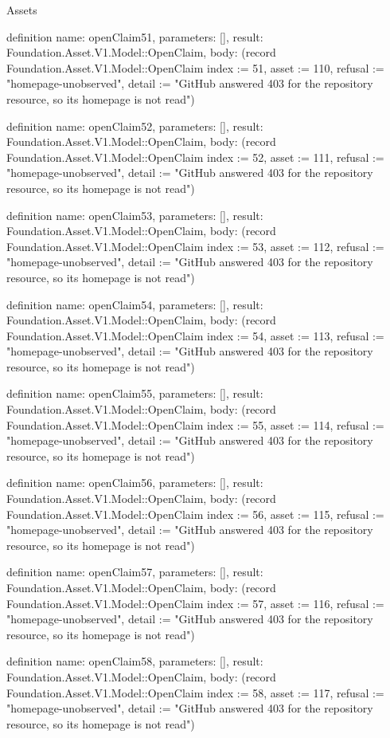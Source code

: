 \begin{lexlean}{Assets}
\begin{semanticmodule}
definition{
  name: openClaim51,
  parameters: [],
  result: Foundation.Asset.V1.Model::OpenClaim,
  body: (record Foundation.Asset.V1.Model::OpenClaim {index := 51, asset := 110, refusal := "homepage-unobserved", detail := "GitHub answered 403 for the repository resource, so its homepage is not read"})
}

definition{
  name: openClaim52,
  parameters: [],
  result: Foundation.Asset.V1.Model::OpenClaim,
  body: (record Foundation.Asset.V1.Model::OpenClaim {index := 52, asset := 111, refusal := "homepage-unobserved", detail := "GitHub answered 403 for the repository resource, so its homepage is not read"})
}

definition{
  name: openClaim53,
  parameters: [],
  result: Foundation.Asset.V1.Model::OpenClaim,
  body: (record Foundation.Asset.V1.Model::OpenClaim {index := 53, asset := 112, refusal := "homepage-unobserved", detail := "GitHub answered 403 for the repository resource, so its homepage is not read"})
}

definition{
  name: openClaim54,
  parameters: [],
  result: Foundation.Asset.V1.Model::OpenClaim,
  body: (record Foundation.Asset.V1.Model::OpenClaim {index := 54, asset := 113, refusal := "homepage-unobserved", detail := "GitHub answered 403 for the repository resource, so its homepage is not read"})
}

definition{
  name: openClaim55,
  parameters: [],
  result: Foundation.Asset.V1.Model::OpenClaim,
  body: (record Foundation.Asset.V1.Model::OpenClaim {index := 55, asset := 114, refusal := "homepage-unobserved", detail := "GitHub answered 403 for the repository resource, so its homepage is not read"})
}

definition{
  name: openClaim56,
  parameters: [],
  result: Foundation.Asset.V1.Model::OpenClaim,
  body: (record Foundation.Asset.V1.Model::OpenClaim {index := 56, asset := 115, refusal := "homepage-unobserved", detail := "GitHub answered 403 for the repository resource, so its homepage is not read"})
}

definition{
  name: openClaim57,
  parameters: [],
  result: Foundation.Asset.V1.Model::OpenClaim,
  body: (record Foundation.Asset.V1.Model::OpenClaim {index := 57, asset := 116, refusal := "homepage-unobserved", detail := "GitHub answered 403 for the repository resource, so its homepage is not read"})
}

definition{
  name: openClaim58,
  parameters: [],
  result: Foundation.Asset.V1.Model::OpenClaim,
  body: (record Foundation.Asset.V1.Model::OpenClaim {index := 58, asset := 117, refusal := "homepage-unobserved", detail := "GitHub answered 403 for the repository resource, so its homepage is not read"})
}


\end{semanticmodule}
\end{lexlean}
